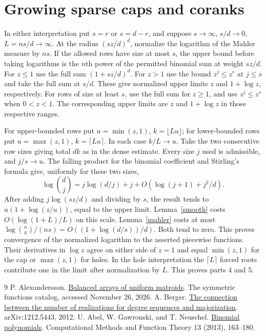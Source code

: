 \documentclass[11pt]{article}
\begin{document}
\section{Growing sparse caps and coranks}
In either interpretation put $s=r$ or $s=d-r$, and suppose $s\to\infty$, $s/d\to0$, $L=ns/d\to\infty$. At the radius $(sz/d)^d$, normalize the logarithm of the Mahler measure by $ns$. If the allowed rows have size at most $s$, the upper bound before taking logarithms is the $n$th power of the permitted binomial sum at weight $sz/d$. For $z\le1$ use the full sum $(1+sz/d)^d$. For $z>1$ use the bound $z^j\le z^s$ at $j\le s$ and take the full sum at $s/d$. These give normalized upper limits $z$ and $1+\log z$, respectively. For rows of size at least $s$, use the full sum for $z\ge1$, and use $z^j\le z^s$ when $0<z<1$. The corresponding upper limits are $z$ and $1+\log z$ in those respective ranges.

For upper-bounded rows put $u=\min(z,1)$, $k=\lfloor Lu\rfloor$; for lower-bounded rows put $u=\max(z,1)$, $k=\lceil Lu\rceil$. In each case $k/L\to u$. Take the two consecutive row sizes giving total $dk$ as in the dense estimate. Every size $j$ used is admissible, and $j/s\to u$. The falling product for the binomial coefficient and Stirling's formula give, uniformly for these two sizes,
\[
 \log\binom dj=j\log(d/j)+j+O(\log(j+1)+j^2/d).
\]
After adding $j\log(sz/d)$ and dividing by $s$, the result tends to $u(1+\log(z/u))$, equal to the upper limit. Lemma~\ref{smooth} costs $O(\log(1+L)/L)$ on this scale. Lemma~\ref{mahler} costs at most $\log\binom nk/(ns)=O((1+\log(d/s))/d)$. Both tend to zero. This proves convergence of the normalized logarithm to the asserted piecewise functions. Their derivatives in $\log z$ agree on either side of $z=1$ and equal $\min(z,1)$ for the cap or $\max(z,1)$ for holes. In the hole interpretation the $\lceil L\rceil$ forced roots contribute one in the limit after normalization by $L$. This proves parts 4 and 5.

\begin{thebibliography}{9}
 P. Alexandersson. \href{https://www.symmetricfunctions.com/realRootedOpenProblems.htm\#conjBalancedArrays}{Balanced arrays of uniform matroids}. The symmetric functions catalog, accessed November 26, 2026.
 A. Berger. \href{https://arxiv.org/abs/1212.5443}{The connection between the number of realizations for degree sequences and majorization}. arXiv:1212.5443, 2012.
 U. Abel, W. Gawronski, and T. Neuschel. \href{https://doi.org/10.1007/s40315-013-0013-3}{Binomial polynomials}. Computational Methods and Function Theory 13 (2013), 163--180.
\end{thebibliography}
\end{document}
